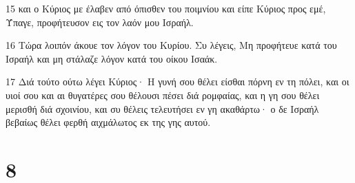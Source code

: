 \par 15 και ο Κύριος με έλαβεν από όπισθεν του ποιμνίου και είπε Κύριος προς εμέ, Ύπαγε, προφήτευσον εις τον λαόν μου Ισραήλ.
\par 16 Τώρα λοιπόν άκουε τον λόγον του Κυρίου. Συ λέγεις, Μη προφήτευε κατά του Ισραήλ και μη στάλαζε λόγον κατά του οίκου Ισαάκ.
\par 17 Διά τούτο ούτω λέγει Κύριος· Η γυνή σου θέλει είσθαι πόρνη εν τη πόλει, και οι υιοί σου και αι θυγατέρες σου θέλουσι πέσει διά ρομφαίας, και η γη σου θέλει μερισθή διά σχοινίου, και συ θέλεις τελευτήσει εν γη ακαθάρτω· ο δε Ισραήλ βεβαίως θέλει φερθή αιχμάλωτος εκ της γης αυτού.

\chapter{8}

